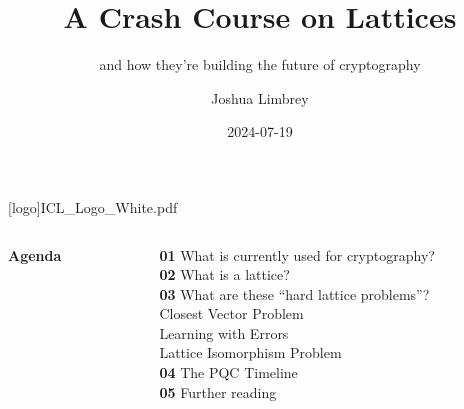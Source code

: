 \documentclass[
aspectratio=169, %
t, %
onlytextwidth, %
10pt, %
]{beamer}
\title{A Crash Course on Lattices} %
\subtitle{and how they're building the future of cryptography} %
\author{Joshua Limbrey} %
\date{2024-07-19} %
\begin{document}




\begingroup
{} %
[logo]{ICL_Logo_White.pdf} %
\frame[plain, s]{\titlepage} %
\endgroup



\begingroup
{} %

\begin{frame}
    \begin{columns}[T] %
        \begin{column}{0.48\linewidth} %
            \HUGE\textbf{Agenda}
        \end{column}
        \begin{column}{0.48\linewidth} %
            \textbf{01} What is currently used for cryptography?\\ %
            \textbf{02} What is a lattice?\\
            \textbf{03} What are these ``hard lattice problems''?\\
            \textbf{   } Closest Vector Problem\\
            \textbf{   } Learning with Errors\\
            \textbf{   } Lattice Isomorphism Problem\\
            \textbf{04} The PQC Timeline\\
            \textbf{05} Further reading
        \end{column}
    \end{columns}
\end{frame}
\endgroup
\end{document}
